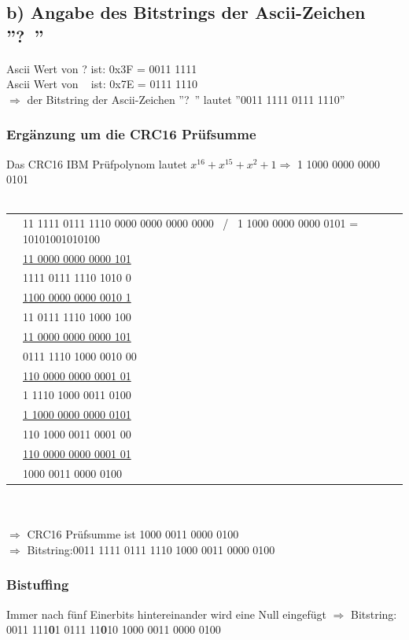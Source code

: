 \documentclass[numbers=noendperiod]{scrartcl}
\begin{document}
\subsection*{b) Angabe des Bitstrings der Ascii-Zeichen ''?~''}
Ascii Wert von ? ist: 0x3F = 0011 1111 \\
Ascii Wert von ~ ist: 0x7E = 0111 1110 \\
\(\Rightarrow \) der Bitstring der Ascii-Zeichen ''?~'' lautet ''0011 1111 0111 1110''
\subsubsection*{Ergänzung um die CRC16 Prüfsumme}
Das CRC16 IBM Prüfpolynom lautet \(x^{16}+x^{15}+x^2 + 1 \Rightarrow \) 1 1000 0000 0000 0101 \\ \\
  \begin{tabular}{cl}
&11 1111 0111 1110 0000 0000 0000 0000 \ / \ 1 1000 0000 0000 0101 = 10101001010100\\
&\underline{11 0000 0000 0000 101}\\
   &\phantom{00 }1111 0111 1110 1010 0\\
   &\phantom{00 }\underline{1100 0000 0000 0010 1}\\
     &\phantom{00 00}11 0111 1110 1000 100\\
	 &\phantom{00 00}\underline{11 0000 0000 0000 101}\\
		&\phantom{00 0000 }0111 1110 1000 0010 00\\
		 &\phantom{00 0000 0}\underline{110 0000 0000 0001 01}\\
		   &\phantom{00 0000 000}1 1110 1000 0011 0100\\
		   &\phantom{00 0000 000}\underline{1 1000 0000 0000 0101}\\
		      &\phantom{00 0000 0000 0}110 1000 0011 0001 00\\
		      &\phantom{00 0000 0000 0}\underline{110 0000 0000 0001 01}\\
		          &\phantom{00 0000 0000 0000 }1000 0011 0000 0100\\
		        \end{tabular}\\ \\
		        \(\Rightarrow\) CRC16 Prüfsumme ist 1000 0011 0000 0100\\
		        \(\Rightarrow\) Bitstring:0011 1111 0111 1110 1000 0011 0000 0100
\subsubsection*{Bistuffing}
Immer nach fünf Einerbits hintereinander wird eine Null eingefügt
 \(\Rightarrow\) Bitstring: 0011 111\textbf{0}1 0111 11\textbf{0}10 1000 0011 0000 0100
\end{document}
